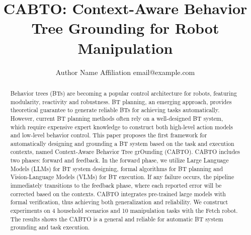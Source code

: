 \documentclass{article}
\title{CABTO: Context-Aware Behavior Tree Grounding for Robot Manipulation}
\author{
    Author Name
    \affiliations
    Affiliation
    \emails
    email@example.com
}
\begin{document}
\maketitle

\begin{abstract}

Behavior trees (BTs) are becoming a popular control architecture for robots, featuring modularity, reactivity and robustness. BT planning, an emerging approach, provides theoretical guarantee to generate reliable BTs for achieving tasks automatically. However, current BT planning methods often rely on a well-designed BT system, which require expensive expert knowledge to construct both high-level action models and low-level behavior control. This paper proposes the first framework for automatically designing and grounding a BT system based on the task and execution contexts, named Context-Aware Behavior Tree grOunding (CABTO). CABTO includes two phases: forward and feedback. In the forward phase, we utilize Large Language Models (LLMs) for BT system designing, formal algorithms for BT planning and Vision-Language Models (VLMs) for BT execution. If any failure occurs, the pipeline immediately transitions to the feedback phase, where each reported error will be corrected based on the contexts. CABTO integrates pre-trained large models with formal verification, thus achieving both generalization and reliability. We construct experiments on 4 household scenarios and 10 manipulation tasks with the Fetch robot. The results shows the CABTO is a general and reliable for automatic BT system grounding and task execution.



\end{abstract}
\end{document}
